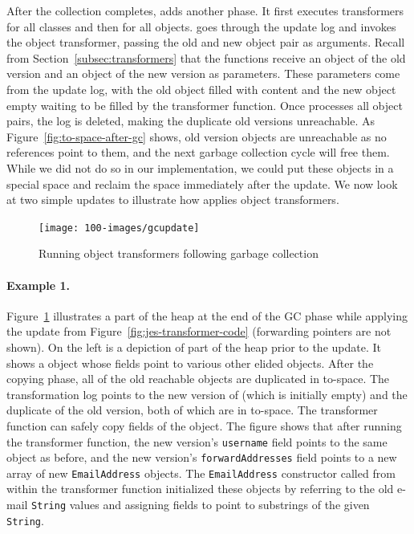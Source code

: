 After the collection completes, \JV adds another phase. It
first executes transformers for all
classes and then for all objects. 
\JV goes through the update log and invokes the object transformer,
passing the old and new object pair as arguments. Recall from
Section~\ref{subsec:transformers} that the \JO functions receive an object
of the old version and an object of the new version as parameters. These
parameters come from the update log, with the old object filled with
content and the new object empty waiting to be filled by the transformer
function. Once \JV processes all object pairs, the log is deleted, making
the  duplicate old versions unreachable.
As Figure~\ref{fig:to-space-after-gc} shows, old version objects are
unreachable as no references point to them, and the next garbage collection
cycle will free them. While we did not do so in our implementation, we
could put these objects in a special space and reclaim the space
immediately after the update. We now look at two simple updates to
illustrate how \JV applies object transformers.

\begin{figure}[t]
\centering
\texttt{[image: 100-images/gcupdate]}
\caption{Running object transformers following garbage collection}
\label{fig:gc-example}
\end{figure}

\paragraph{Example 1.} Figure~\ref{fig:gc-example} illustrates a part of
the heap at the end of the GC phase while applying the update from
Figure~\ref{fig:jes-transformer-code} (forwarding pointers are not shown).
On the
left is a depiction of part of the heap prior to the update.  It shows a
\User object whose fields point to various other elided objects.
After the copying phase, all of the old reachable objects are duplicated in
to-space.  The transformation log points to the new version of \User
(which is initially empty) and the duplicate of the old version, both of
which are in to-space.  The transformer function can safely copy fields of
the \FROM object. The figure shows that after running the transformer
function, the new version's {\tt username} field points to the same object
as before, and the new version's {\tt forwardAddresses} field points to a
new array of new {\tt EmailAddress} objects.
The {\tt EmailAddress} constructor called from within the
transformer function initialized these objects by referring to the old
e-mail {\tt String} values and assigning fields to point to substrings of
the given {\tt String}.

